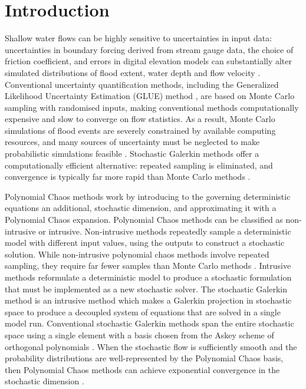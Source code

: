 \section{Introduction}
Shallow water flows can be highly sensitive to uncertainties in input data: uncertainties in boundary forcing derived from stream gauge data, the choice of friction coefficient, and errors in digital elevation models can substantially alter simulated distributions of flood extent, water depth and flow velocity \citep{bates2014,jung-merwade2012}.
Conventional uncertainty quantification methods, including the Generalized Likelihood Uncertainty Estimation (GLUE) method \citep{beven-binley1992}, are based on Monte Carlo sampling with randomised inputs, making conventional methods computationally expensive and slow to converge on flow statistics.
As a result, Monte Carlo simulations of flood events are severely constrained by available computing resources, and many sources of uncertainty must be neglected to make probabilistic simulations feasible \citep{neal2013}.
Stochastic Galerkin methods offer a computationally efficient alternative: repeated sampling is eliminated, and convergence is typically far more rapid than Monte Carlo methods \citep{xiu2009,ge2008}.

Polynomial Chaos methods work by introducing to the governing deterministic equations an additional, stochastic dimension, and approximating it with a Polynomial Chaos expansion.
Polynomial Chaos methods can be classified as non-intrusive or intrusive.
Non-intrusive methods repeatedly sample a deterministic model with different input values, using the outputs to construct a stochastic solution.
While non-intrusive polynomial chaos methods involve repeated sampling, they require far fewer samples than Monte Carlo methods \citep{ge2008}.
Intrusive methods reformulate a deterministic model to produce a stochastic formulation that must be implemented as a new stochastic solver.
The stochastic Galerkin method is an intrusive method which makes a Galerkin projection in stochastic space to produce a decoupled system of equations that are solved in a single model run.
Conventional stochastic Galerkin methods span the entire stochastic space using a single element with a basis chosen from the Askey scheme of orthogonal polynomials \citep{xiu-karniadakis2002}.
When the stochastic flow is sufficiently smooth and the probability distributions are well-represented by the Polynomial Chaos basis, then Polynomial Chaos methods can achieve exponential convergence in the stochastic dimension \citep{xiu-karniadakis2003}.

